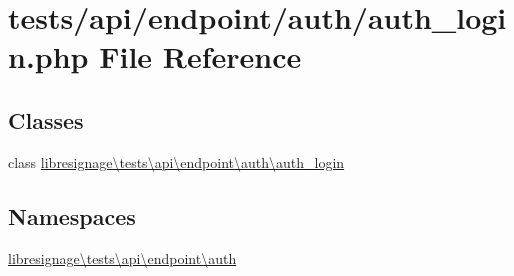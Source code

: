 \hypertarget{tests_2api_2endpoint_2auth_2auth__login_8php}{}\section{tests/api/endpoint/auth/auth\+\_\+login.php File Reference}
\label{tests_2api_2endpoint_2auth_2auth__login_8php}
\subsection*{Classes}
\begin{DoxyCompactItemize}
\item 
class \hyperlink{classlibresignage_1_1tests_1_1api_1_1endpoint_1_1auth_1_1auth__login}{libresignage\textbackslash{}tests\textbackslash{}api\textbackslash{}endpoint\textbackslash{}auth\textbackslash{}auth\+\_\+login}
\end{DoxyCompactItemize}
\subsection*{Namespaces}
\begin{DoxyCompactItemize}
\item 
 \hyperlink{namespacelibresignage_1_1tests_1_1api_1_1endpoint_1_1auth}{libresignage\textbackslash{}tests\textbackslash{}api\textbackslash{}endpoint\textbackslash{}auth}
\end{DoxyCompactItemize}
